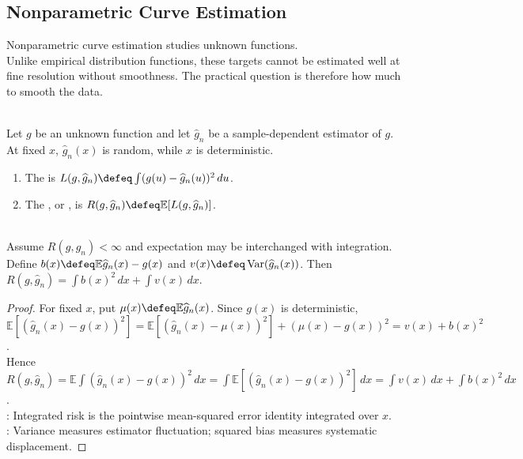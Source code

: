 \subsection{Nonparametric Curve Estimation}

Nonparametric curve estimation studies unknown functions.\\
Unlike empirical distribution functions, these targets cannot be estimated well at fine resolution without smoothness. The practical question is therefore how much to smooth the data.

\begin{definition} \label{def:curve-estimator-ise-mise} \\
Let $g$ be an unknown function and let $\widehat g_n$ be a sample-dependent estimator of $g$.\\
At fixed $x$, $\widehat g_n(x)$ is random, while $x$ is deterministic.
\begin{enumerate}[label=(\roman*)]
\setlength{\itemsep}{0pt}
\item The  is $L(g,\widehat g_n)\defeq\int (g(u)-\widehat g_n(u))^2\,du$.
\item The , or , is $R(g,\widehat g_n)\defeq\mathbb{E}[L(g,\widehat g_n)]$.
\end{enumerate}
\end{definition}

\begin{theorem} \label{thm:curve-risk-bias-variance-decomposition} \\
Assume $R(g,\widehat g_n)<\infty$ and expectation may be interchanged with integration.\\
Define $b(x)\defeq\mathbb{E}\widehat g_n(x)-g(x)$ and $v(x)\defeq\operatorname{Var}(\widehat g_n(x))$. Then $R(g,\widehat g_n)=\int b(x)^2\,dx+\int v(x)\,dx$.
\begin{proof} For fixed $x$, put $\mu(x)\defeq\mathbb{E}\widehat g_n(x)$.
Since $g(x)$ is deterministic, $\mathbb{E}[(\widehat g_n(x)-g(x))^2]=\mathbb{E}[(\widehat g_n(x)-\mu(x))^2]+(\mu(x)-g(x))^2=v(x)+b(x)^2$.\\
Hence $R(g,\widehat g_n)=\mathbb{E}\int(\widehat g_n(x)-g(x))^2\,dx=\int\mathbb{E}[(\widehat g_n(x)-g(x))^2]\,dx=\int v(x)\,dx+\int b(x)^2\,dx$.\\
: Integrated risk is the pointwise mean-squared error identity integrated over $x$.\\
: Variance measures estimator fluctuation; squared bias measures systematic displacement.
\end{proof}
\end{theorem}

